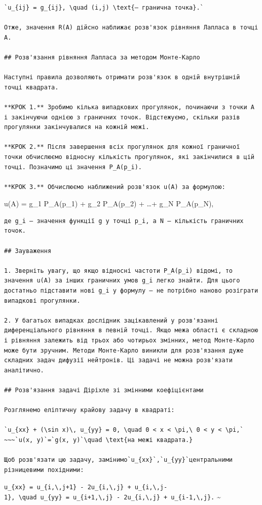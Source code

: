 \documentclass[
  ukrainian,
]{article}
\begin{document}
\begin{verbatim}
`u_{ij} = g_{ij}, \quad (i,j) \text{— гранична точка}.`

Отже, значення R(A) дійсно наближає розв'язок рівняння Лапласа в точці A.

## Розв'язання рівняння Лапласа за методом Монте-Карло

Наступні правила дозволяють отримати розв'язок в одній внутрішній точці квадрата.

**КРОК 1.** Зробимо кілька випадкових прогулянок, починаючи з точки A і закінчуючи однією з граничних точок. Відстежуємо, скільки разів прогулянки закінчувалися на кожній межі.

**КРОК 2.** Після завершення всіх прогулянок для кожної граничної точки обчислюємо відносну кількість прогулянок, які закінчилися в цій точці. Позначимо ці значення P_A(p_i).

**КРОК 3.** Обчислюємо наближений розв'язок u(A) за формулою:
\end{verbatim}

u(A) = g\_1 P\_A(p\_1) + g\_2 P\_A(p\_2) + \dots + g\_N P\_A(p\_N),

\begin{verbatim}
де g_i — значення функції g у точці p_i, а N — кількість граничних точок.

## Зауваження

1. Зверніть увагу, що якщо відносні частоти P_A(p_i) відомі, то значення u(A) за інших граничних умов g_i легко знайти. Для цього достатньо підставити нові g_i у формулу — не потрібно наново розіграти випадкові прогулянки.

2. У багатьох випадках дослідник зацікавлений у розв'язанні диференціального рівняння в певній точці. Якщо межа області є складною і рівняння залежить від трьох або чотирьох змінних, метод Монте-Карло може бути зручним. Методи Монте-Карло виникли для розв'язання дуже складних задач дифузії нейтронів. Ці задачі не можна розв'язати аналітично.

## Розв'язання задачі Діріхле зі змінними коефіцієнтами

Розглянемо еліптичну крайову задачу в квадраті:

`u_{xx} + (\sin x)\, u_{yy} = 0, \quad 0 < x < \pi,\ 0 < y < \pi,`
~~~`u(x, y)`=`g(x, y)`\quad \text{на межі квадрата.}

Щоб розв'язати цю задачу, замінимо`u_{xx}`,`u_{yy}`центральними різницевими похідними:
\end{verbatim}

\texttt{u\_\{xx\}\ =\ u\_\{i,\textbackslash{},j+1\}\ -\ 2u\_\{i,\textbackslash{},j\}\ +\ u\_\{i,\textbackslash{},j-1\},\ \textbackslash{}quad\ u\_\{yy\}\ =\ u\_\{i+1,\textbackslash{},j\}\ -\ 2u\_\{i,\textbackslash{},j\}\ +\ u\_\{i-1,\textbackslash{},j\}.}
\textsubscript{}\textasciitilde{}
\end{document}
